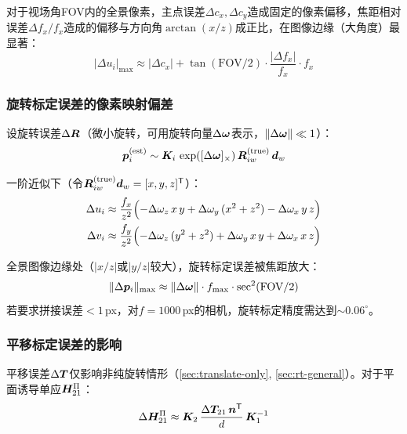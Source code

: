 \begin{proposition}[内参误差界]
对于视场角FOV内的全景像素，主点误差$\Delta c_x, \Delta c_y$造成固定的像素偏移，焦距相对误差$\Delta f_x/f_x$造成的偏移与方向角$\arctan(x/z)$成正比，在图像边缘（大角度）最显著：
\[
|\Delta u_i|_{\max} \approx |\Delta c_x| + \tan(\text{FOV}/2)\cdot\frac{|\Delta f_x|}{f_x}\cdot f_x
\]
\end{proposition}

\subsubsection{旋转标定误差的像素映射偏差}

设旋转误差$\Delta\bm{R}$（微小旋转，可用旋转向量$\Delta\bm{\omega}$表示，$\|\Delta\bm{\omega}\| \ll 1$）：
\begin{equation}
\bm{p}_i^{\text{(est)}} \sim \bm{K}_i\,\exp([\Delta\bm{\omega}]_\times)\,\bm{R}_{iw}^{\text{(true)}}\,\bm{d}_w
\label{eq:r-error}
\end{equation}

一阶近似下（令$\bm{R}_{iw}^{\text{(true)}}\bm{d}_w = [x,y,z]^{\mathsf{T}}$）：
\begin{align}
\Delta u_i &\approx \frac{f_x}{z^2}\Bigl(
              -\Delta\omega_z\,x\,y + \Delta\omega_y\,(x^2+z^2) - \Delta\omega_x\,y\,z
              \Bigr) \label{eq:du-dr} \\
\Delta v_i &\approx \frac{f_y}{z^2}\Bigl(
              -\Delta\omega_z\,(y^2+z^2) + \Delta\omega_y\,x\,y + \Delta\omega_x\,x\,z
              \Bigr) \label{eq:dv-dr}
\end{align}

\begin{proposition}[旋转误差界]
全景图像边缘处（$|x/z|$或$|y/z|$较大），旋转标定误差被焦距放大：
\[
\|\Delta\bm{p}_i\|_{\max} \approx \|\Delta\bm{\omega}\| \cdot f_{\max} \cdot \sec^2(\text{FOV}/2)
\]
若要求拼接误差$<1$\,px，对$f=1000$\,px的相机，旋转标定精度需达到$\sim 0.06^\circ$。
\end{proposition}

\subsubsection{平移标定误差的影响}

平移误差$\Delta\bm{T}$仅影响非纯旋转情形（\cref{sec:translate-only}, \ref{sec:rt-general}）。对于平面诱导单应$\bm{H}_{21}^{\Pi}$：
\begin{equation}
\Delta\bm{H}_{21}^{\Pi} \approx \bm{K}_2\,\frac{\Delta\bm{T}_{21}\,\bm{n}^{\mathsf{T}}}{d}\,\bm{K}_1^{-1}
\label{eq:t-error-H}
\end{equation}

